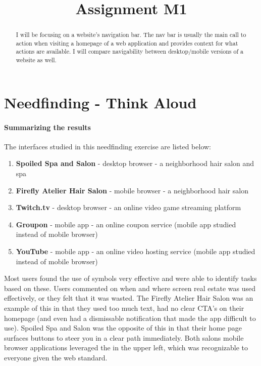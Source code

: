 

\title{Assignment M1\\}



\maketitle
\thispagestyle{fancy}

% 

\begin{abstract}
I will be focusing on a website’s navigation bar. The nav bar is usually the main call to action when visiting a homepage of a web application and provides context for what actions are available. I will compare navigability between desktop/mobile versions of a website as well.
\end{abstract}


\section{Needfinding - Think Aloud}

\paragraph{Summarizing the results}
The interfaces studied in this needfinding exercise are listed below:

\begin{enumerate}
\item
  \textbf{Spoiled Spa and Salon} - desktop browser - a neighborhood hair salon and spa
\item
  \textbf{Firefly Atelier Hair Salon} - mobile browser - a neighborhood hair salon
\item
  \textbf{Twitch.tv} - desktop browser - an online video game streaming platform
\item
  \textbf{Groupon} - mobile app - an online coupon service (mobile app studied instead of mobile browser)
\item
  \textbf{YouTube} - mobile app - an online video hosting service (mobile app studied instead of mobile browser)
\end{enumerate}

Most users found the use of symbols very effective and were able to identify tasks based on these. Users commented on when and where screen real estate was used effectively, or they felt that it was wasted. The Firefly Atelier Hair Salon was an example of this in that they used too much text, had no clear CTA's on their homepage (and even had a dismissable notification that made the app difficult to use). Spoiled Spa and Salon was the opposite of this in that their home page surfaces buttons to steer you in a clear path immediately. Both salons mobile browser applications leveraged the  in the upper left, which was recognizable to everyone given the web standard.

